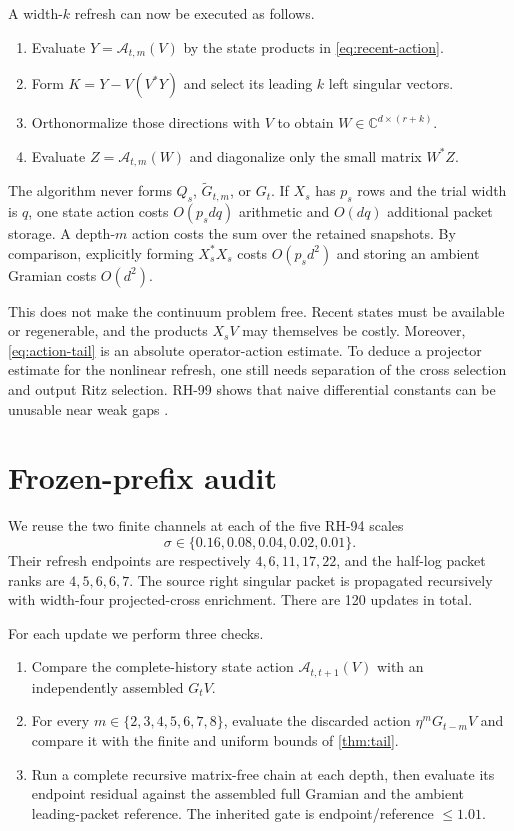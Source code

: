 \documentclass[11pt]{article}
\theoremstyle{definition}
\theoremstyle{remark}
\begin{document}
A width-$k$ refresh can now be executed as follows.
\begin{enumerate}[leftmargin=2em]
\item Evaluate $Y=\mathcal A_{t,m}(V)$ by the state products in
\eqref{eq:recent-action}.
\item Form $K=Y-V(V^*Y)$ and select its leading $k$ left singular vectors.
\item Orthonormalize those directions with $V$ to obtain
$W\in\mathbb C^{d\times(r+k)}$.
\item Evaluate $Z=\mathcal A_{t,m}(W)$ and diagonalize only the small matrix
$W^*Z$.
\end{enumerate}
The algorithm never forms $Q_s$, $\widetilde G_{t,m}$, or $G_t$.  If
$X_s$ has $p_s$ rows and the trial width is $q$, one state action costs
$O(p_sdq)$ arithmetic and $O(dq)$ additional packet storage.  A depth-$m$
action costs the sum over the retained snapshots.  By comparison, explicitly
forming $X_s^*X_s$ costs $O(p_sd^2)$ and storing an ambient Gramian costs
$O(d^2)$.

This does not make the continuum problem free.  Recent states must be
available or regenerable, and the products $X_sV$ may themselves be costly.
Moreover, \eqref{eq:action-tail} is an absolute operator-action estimate.  To
deduce a projector estimate for the nonlinear refresh, one still needs
separation of the cross selection and output Ritz selection.  RH-99 shows
that naive differential constants can be unusable near weak gaps
\citep{WangTwoGap2026}.

\section{Frozen-prefix audit}
\label{sec:audit}

We reuse the two finite channels at each of the five RH-94 scales
\[
 \sigma\in\{0.16,0.08,0.04,0.02,0.01\}.
\]
Their refresh endpoints are respectively $4,6,11,17,22$, and the half-log
packet ranks are $4,5,6,6,7$.  The source right singular packet is propagated
recursively with width-four projected-cross enrichment.  There are 120
updates in total.

For each update we perform three checks.
\begin{enumerate}[leftmargin=2em]
\item Compare the complete-history state action
$\mathcal A_{t,t+1}(V)$ with an independently assembled $G_tV$.
\item For every $m\in\{2,3,4,5,6,7,8\}$, evaluate the discarded action
$\eta^mG_{t-m}V$ and compare it with the finite and uniform bounds of
\cref{thm:tail}.
\item Run a complete recursive matrix-free chain at each depth, then evaluate
its endpoint residual against the assembled full Gramian and the ambient
leading-packet reference.  The inherited gate is endpoint/reference
$\le1.01$.
\end{enumerate}
\end{document}
